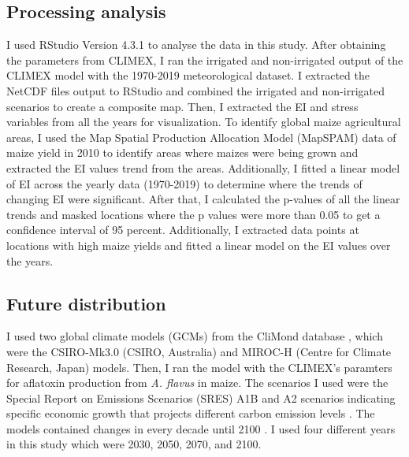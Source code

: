 \vspace{\baselineskip}


\subsection{Processing analysis}

I used RStudio Version 4.3.1 \citep{RStudio} to analyse the data in this study. After obtaining the parameters from CLIMEX, I ran the irrigated and non-irrigated output of the CLIMEX model with the 1970-2019 meteorological dataset. I extracted the NetCDF files output to RStudio \citep{RStudio} and combined the irrigated and non-irrigated scenarios to create a composite map. Then, I extracted the EI and stress variables from all the years for visualization. To identify global maize agricultural areas, I used the Map Spatial Production Allocation Model (MapSPAM) data of maize yield in 2010 \citep{international2019global} to identify areas where maizes were being grown and extracted the EI values trend from the areas. Additionally, I fitted a linear model of EI across the yearly data (1970-2019) to determine where the trends of changing EI were significant. After that, I calculated the p-values of all the linear trends and masked locations where the p values were more than 0.05 to get a confidence interval of 95 percent. Additionally, I extracted data points at locations with high maize yields and fitted a linear model on the EI values over the years.

\subsection{Future distribution}
I used two global climate models (GCMs) from the CliMond database \citep{kriticos2012climond}, which were the CSIRO-Mk3.0 (CSIRO, Australia) and MIROC-H (Centre for Climate Research, Japan) models. Then, I ran the model with the CLIMEX's paramters for aflatoxin production from \textit{A. flavus} in maize. The scenarios I used were the Special Report on Emissions Scenarios (SRES) A1B and A2 scenarios indicating specific economic growth that projects different carbon emission levels \citep{scenarios2000ipcc}. The models contained changes in every decade until 2100 \citep{kriticos2012climond}. I used four different years in this study which were 2030, 2050, 2070, and 2100.